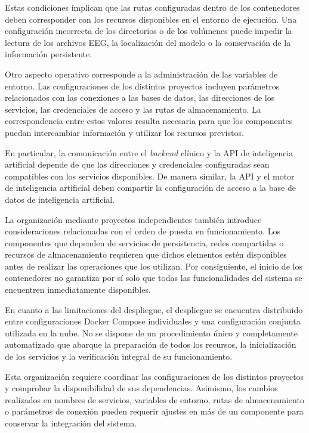 Estas condiciones implican que las rutas configuradas
dentro de los contenedores deben corresponder con los
recursos disponibles en el entorno de ejecución. Una configuración incorrecta de los directorios o de los volúmenes puede impedir la lectura de los archivos EEG, la localización del modelo o la conservación de la información persistente.


Otro aspecto operativo corresponde a la administración
de las variables de entorno. Las configuraciones de los
distintos proyectos incluyen parámetros relacionados con
las conexiones a las bases de datos, las direcciones de
los servicios, las credenciales de acceso y las rutas
de almacenamiento. La correspondencia entre estos valores
resulta necesaria para que los componentes puedan
intercambiar información y utilizar los recursos previstos.

En particular, la comunicación entre el \textit{backend} clínico
y la API de inteligencia artificial depende de que las
direcciones y credenciales configuradas sean compatibles
con los servicios disponibles. De manera similar, la API y el motor de inteligencia artificial
deben compartir la configuración de acceso a la base de datos
de inteligencia artificial.

La organización mediante proyectos independientes también
introduce consideraciones relacionadas con el orden de
puesta en funcionamiento. Los componentes que dependen
de servicios de persistencia, redes compartidas o recursos
de almacenamiento requieren que dichos elementos estén
disponibles antes de realizar las operaciones que los
utilizan. Por consiguiente, el inicio de los contenedores
no garantiza por sí solo que todas las funcionalidades
del sistema se encuentren inmediatamente disponibles.

En cuanto a las limitaciones del despliegue, el despliegue se encuentra distribuido entre
configuraciones Docker Compose individuales y una configuración conjunta utilizada en la nube.
No se dispone de un procedimiento único y completamente automatizado que abarque la preparación de todos los recursos, la inicialización de los servicios y la verificación integral de su funcionamiento.

Esta organización requiere coordinar las configuraciones
de los distintos proyectos y comprobar la disponibilidad
de sus dependencias. Asimismo, los cambios realizados
en nombres de servicios, variables de entorno, rutas
de almacenamiento o parámetros de conexión pueden
requerir ajustes en más de un componente para conservar
la integración del sistema.

